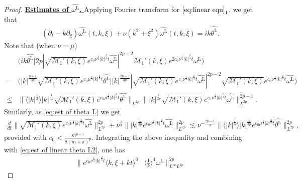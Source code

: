 \documentclass[reqno, 12pt]{amsart} %
\theoremstyle{plain} %
\theoremstyle{definition}
\theoremstyle{remark}
\numberwithin{equation}{section} %
\newcommand{\pt}{\partial_t}
\newcommand{\pxi}{\partial_\xi}
\begin{document}
\begin{proof}
		
		\underline{\bf Estimates of  $\widehat{\omega^{\mathrm{L}}}$. }
		Applying Fourier transform for $\eqref{eq:linear equ}_1$, we get that 
		\begin{equation*}\begin{aligned} \label{eq:linear Fourier for omega}
				(\pt- k\pxi) \widehat{\omega^{\mathrm{L}} }(t, k, \xi)  + \nu(k^2 + \xi^2) \widehat{\omega ^{\mathrm{L}} }(t, k, \xi)   = ik \widehat{\theta ^{\mathrm{L}}}.
		\end{aligned}\end{equation*}
		Note that (when $\nu=\mu$)
		\small{\begin{align*}
				&\big( ik  \widehat{\theta ^{\mathrm{L}}} \big| 2p | \sqrt{\mathcal{M}_1'(k, \xi)} e^{c_0 \nu^\frac13 |k|^\frac23 t} \widehat{\omega^{\mathrm{L}} }|^{2p-2} \mathcal{M}_1'(k, \xi) e^{2c_0 \nu^\frac13 |k|^\frac23 t} \widehat{\omega^{\mathrm{L}} } \big)\\
				=& \big( |k|^{\frac{p+1}{3p}} \sqrt{\mathcal{M}_1'(k, \xi) } e^{c_0 \mu^\frac13 |k|^\frac23 t}  \widehat{\theta ^{\mathrm{L}}} \big| |k|^\frac{2p-1}{3p}| \sqrt{\mathcal{M}_1'(k, \xi)} e^{c_0 \nu^\frac13 |k|^\frac23 t} \widehat{\omega^{\mathrm{L}} }|^{2p-2} \sqrt{\mathcal{M}_1'(k, \xi) }  e^{c_0 \nu^\frac13 |k|^\frac23 t} \widehat{\omega^{\mathrm{L}} } \big)\\
				\leq & \| \langle|k|^\frac13 \rangle|k|^\frac{1}{3p}  \sqrt{\mathcal{M}_1'(k, \xi)} e^{c_0 \mu^\frac13 |k|^\frac23 t} \widehat{\theta^{\mathrm{L}} }\|_{L^{2p}}  \| |k|^\frac{1}{3p}  \sqrt{\mathcal{M}_1'(k, \xi)} e^{c_0 \nu^\frac13 |k|^\frac23 t} \widehat{\omega^{\mathrm{L}} }\|_{L^{2p}}^{2p-1}.
		\end{align*}}
		Similarly, as \eqref{eq:est of theta L} we get 
		\begin{align*}
			\frac{d}{dt} \|  \sqrt{\mathcal{M}_1'(k, \xi)} e^{c_0 \nu^\frac13 |k|^\frac23 t} \widehat{\omega^{\mathrm{L}} } \|_{L^{2p}}^{2p}  +  \nu^\frac13  \| |k|^\frac{1}{3p} e^{c_0 \nu^\frac13 |k|^\frac23 t} \widehat{\omega^{\mathrm{L}} }\|_{L^{2p}}^{2p} 
			\lesssim \nu^{-\frac{2p-1}{3}} \| \langle|k|^\frac13 \rangle|k|^\frac{1}{3p}  e^{c_0 \mu^\frac13 |k|^\frac23 t} \widehat{\theta^{\mathrm{L}} }\|_{L^{2p}}^{2p},
		\end{align*}
		provided with $c_0 <  \frac{m^{p-1}}{8(m+\pi)^p}$. Integrating the above inequality and combining with \eqref{eq:est of linear theta L2}, one has
		\begin{equation}\begin{aligned} \label{eq:est of linear omega L2}
				\|  e^{c_0 \nu^\frac13 |k|^\frac23 t} \langle k, \xi + kt\rangle^6 & \langle \frac{1}{k}\rangle^4 \widehat{\omega^{\mathrm{L}}} \|_{L^\infty L^{2p}}^{2p} 

\end{aligned}
\end{equation}
\end{proof}
\end{document}
